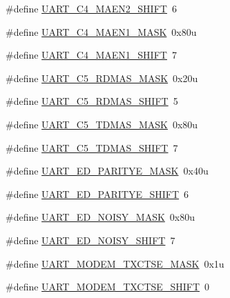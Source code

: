 \begin{DoxyCompactItemize}
\item 
\#define \hyperlink{group___u_a_r_t___register___masks_ga5ec71022d0264fefd4c63118d90adbb2}{U\+A\+R\+T\+\_\+\+C4\+\_\+\+M\+A\+E\+N2\+\_\+\+S\+H\+I\+FT}~6
\item 
\#define \hyperlink{group___u_a_r_t___register___masks_gaa345d5da303c56b2881394dc0e003337}{U\+A\+R\+T\+\_\+\+C4\+\_\+\+M\+A\+E\+N1\+\_\+\+M\+A\+SK}~0x80u
\item 
\#define \hyperlink{group___u_a_r_t___register___masks_ga28655a6deae1adc48798c91db8ce24e1}{U\+A\+R\+T\+\_\+\+C4\+\_\+\+M\+A\+E\+N1\+\_\+\+S\+H\+I\+FT}~7
\item 
\#define \hyperlink{group___u_a_r_t___register___masks_gaef3503f3521ec37397d2d19e7da7bd58}{U\+A\+R\+T\+\_\+\+C5\+\_\+\+R\+D\+M\+A\+S\+\_\+\+M\+A\+SK}~0x20u
\item 
\#define \hyperlink{group___u_a_r_t___register___masks_gab95d268a11167ac6ab4cf41332bf5aa6}{U\+A\+R\+T\+\_\+\+C5\+\_\+\+R\+D\+M\+A\+S\+\_\+\+S\+H\+I\+FT}~5
\item 
\#define \hyperlink{group___u_a_r_t___register___masks_ga593bf2d9f1d2a222d8cbde7b88aba833}{U\+A\+R\+T\+\_\+\+C5\+\_\+\+T\+D\+M\+A\+S\+\_\+\+M\+A\+SK}~0x80u
\item 
\#define \hyperlink{group___u_a_r_t___register___masks_gadf4f03768249772994b3082c369698e7}{U\+A\+R\+T\+\_\+\+C5\+\_\+\+T\+D\+M\+A\+S\+\_\+\+S\+H\+I\+FT}~7
\item 
\#define \hyperlink{group___u_a_r_t___register___masks_gad2d9046649263c73bfa0e64091c82d45}{U\+A\+R\+T\+\_\+\+E\+D\+\_\+\+P\+A\+R\+I\+T\+Y\+E\+\_\+\+M\+A\+SK}~0x40u
\item 
\#define \hyperlink{group___u_a_r_t___register___masks_gaed5785f9e519dfa7936d82f4fedb8a83}{U\+A\+R\+T\+\_\+\+E\+D\+\_\+\+P\+A\+R\+I\+T\+Y\+E\+\_\+\+S\+H\+I\+FT}~6
\item 
\#define \hyperlink{group___u_a_r_t___register___masks_gab5ab58923c23cde1672fc9ae19053696}{U\+A\+R\+T\+\_\+\+E\+D\+\_\+\+N\+O\+I\+S\+Y\+\_\+\+M\+A\+SK}~0x80u
\item 
\#define \hyperlink{group___u_a_r_t___register___masks_gab366fc1267a46213bc540e93c2603a6c}{U\+A\+R\+T\+\_\+\+E\+D\+\_\+\+N\+O\+I\+S\+Y\+\_\+\+S\+H\+I\+FT}~7
\item 
\#define \hyperlink{group___u_a_r_t___register___masks_ga00c7ea6d89eec98c2f6cc98651712c00}{U\+A\+R\+T\+\_\+\+M\+O\+D\+E\+M\+\_\+\+T\+X\+C\+T\+S\+E\+\_\+\+M\+A\+SK}~0x1u
\item 
\#define \hyperlink{group___u_a_r_t___register___masks_gafa34ecab8ca4ea8d72e3c42d846ce96d}{U\+A\+R\+T\+\_\+\+M\+O\+D\+E\+M\+\_\+\+T\+X\+C\+T\+S\+E\+\_\+\+S\+H\+I\+FT}~0

\end{DoxyCompactItemize}
